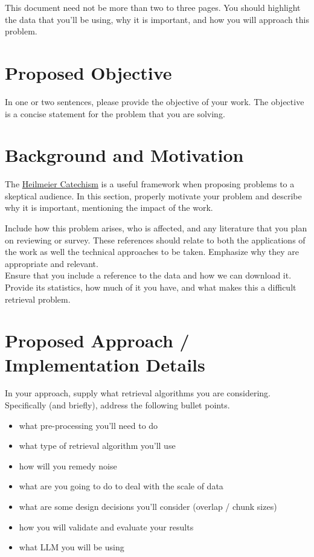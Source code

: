 \documentclass[paper=a4, fontsize=11pt]{scrartcl} %
\author{
    \textbf{NAME(s)} \\ 
    \href{http://www.google.com}{E-MAIL(s)}
}%
\begin{document}
\maketitle %

This document need not be more than two to three pages. You should highlight the data that you'll be using, why it is important, and how you will approach this problem.

\section{Proposed Objective}

In one or two sentences, please provide the objective of your work. The objective is a concise statement for the problem that you are solving. 

\section{Background and Motivation}

The \href{https://www.darpa.mil/work-with-us/heilmeier-catechism}{Heilmeier Catechism} is a useful framework when proposing problems to a skeptical audience. In this section, properly motivate your problem and describe why it is important, mentioning the impact of the work. 

Include how this problem arises, who is affected, and any literature that you plan on reviewing or survey. These references should relate to both the applications of the work as well the technical approaches to be taken. Emphasize why they are appropriate and relevant. \\

Ensure that you include a reference to the data and how we can download it. Provide its statistics, how much of it you have, and what makes this a difficult retrieval problem. \\

\section{Proposed Approach / Implementation Details}

In your approach, supply what retrieval algorithms you are considering. Specifically (and briefly), address the following bullet points.

\begin{itemize}
    \item what pre-processing you'll need to do
    \item what type of retrieval algorithm you'll use
    \item how will you remedy noise
    \item what are you going to do to deal with the scale of data
    \item what are some design decisions you'll consider (overlap / chunk sizes)
    \item how you will validate and evaluate your results
    \item what LLM you will be using
\end{itemize}
\end{document}
